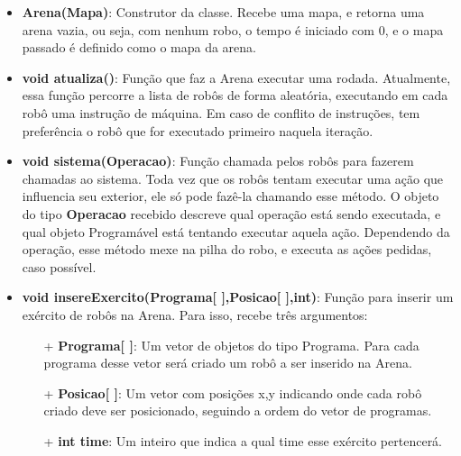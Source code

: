 \documentclass[11pt]{article}
\begin{document}
\begin{itemize}

\item \textbf{Arena({\color{red}Mapa})}: Construtor da classe. Recebe uma mapa, e retorna uma arena vazia, ou seja, com nenhum robo, o tempo é iniciado com 0, e o mapa passado é definido como o mapa da arena.

\item \textbf{{\color{red}void} atualiza()}: Função que faz a Arena executar uma rodada. Atualmente, essa função percorre a lista de robôs de forma aleatória, executando em cada robô uma instrução de máquina. Em caso de conflito de instruções, tem preferência o robô que for executado primeiro naquela iteração.

\item \textbf{{\color{red}void} sistema({\color{red}Operacao})}: Função chamada pelos robôs para fazerem chamadas ao sistema. Toda vez que os robôs tentam executar uma ação que influencia seu exterior, ele só pode fazê-la chamando esse método. O objeto do tipo \textbf{\color{red}Operacao} recebido descreve qual operação está sendo executada, e qual objeto Programável está tentando executar aquela ação. Dependendo da operação, esse método mexe na pilha do robo, e executa as ações pedidas, caso possível.

\item \textbf{{\color{red}void} insereExercito({\color{red}Programa[ ]},{\color{red}Posicao[ ]},{\color{red}int})}: Função para inserir um exército de robôs na Arena. Para isso, recebe três argumentos:
		\begin{itemize}
			
			\item[+] \textbf{Programa[ ]}: Um vetor de objetos do 				tipo {\color{red}Programa}. Para cada programa desse vetor será criado um robô a ser inserido na Arena.
			
			\item[+] \textbf{Posicao[ ]}: Um vetor com posições x,y 				indicando onde cada robô criado deve ser posicionado, 				seguindo a ordem do vetor de programas.
			
			\item[+] \textbf{{\color{red}int} time}: Um inteiro que 				indica a qual time esse exército pertencerá.  			
			
		\end{itemize}				

\end{itemize}
\end{document}
